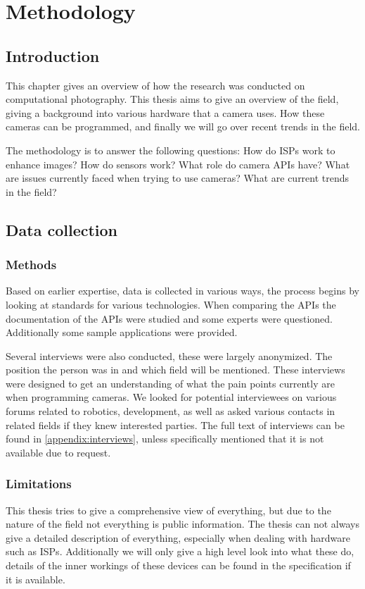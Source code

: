 \chapter{Methodology}
\section{Introduction}
This chapter gives an overview of how the research was conducted on
computational photography. This thesis aims to give an overview of the field,
giving a background into various hardware that a camera uses. How these
cameras can be programmed, and finally we will go over recent trends in the
field.

The methodology is to answer the following questions: How do ISPs work to
enhance images? How do sensors work? What role do camera APIs have? What
are issues currently faced when trying to use cameras? What are current trends
in the field?

\section{Data collection}
\subsection{Methods}
Based on earlier expertise, data is collected in various ways, the process
begins by looking at standards for various technologies. When comparing the APIs
the documentation of the APIs were studied and some experts were questioned.
Additionally some sample applications were provided.

Several interviews were also conducted, these were largely anonymized. The
position the person was in and which field will be mentioned. These interviews
were designed to get an understanding of what the pain points currently are
when programming cameras. We looked for potential interviewees on various
forums related to robotics, development, as well as asked various contacts in
related fields if they knew interested parties. The full text of interviews can
be found in \cref{appendix:interviews}, unless specifically mentioned that it
is not available due to request.

\subsection{Limitations}
This thesis tries to give a comprehensive view of everything, but due to the
nature of the field not everything is public information. The thesis can not
always give a detailed description of everything, especially when dealing with
hardware such as ISPs. Additionally we will only give a high level look into
what these do, details of the inner workings of these devices can be found in
the specification if it is available.

